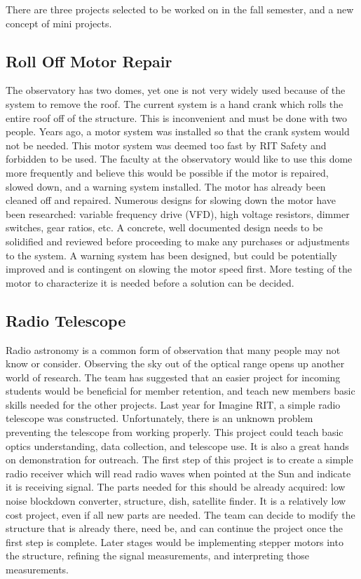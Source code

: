 \documentclass[conference]{IEEEtran} %
\begin{document}
There are three projects selected to be worked on in the fall semester, and a new concept of mini projects.  

\subsection{Roll Off Motor Repair}
\label{subsec:rolloff}
The observatory has two domes, yet one is not very widely used because of the system to remove the roof. The current system is a hand crank which rolls the entire roof off of the structure. This is inconvenient and must be done with two people. Years ago, a motor system was installed so that the crank system would not be needed. This motor system was deemed too fast by RIT Safety and forbidden to be used. The faculty at the observatory would like to use this dome more frequently and believe this would be possible if the motor is repaired, slowed down, and a warning system installed. The motor has already been cleaned off and repaired. Numerous designs for slowing down the motor have been researched: variable frequency drive (VFD), high voltage resistors, dimmer switches, gear ratios, etc. A concrete, well documented design needs to be solidified and reviewed before proceeding to make any purchases or adjustments to the system. A warning system has been designed, but could be potentially improved and is contingent on slowing the motor speed first. More testing of the motor to characterize it is needed before a solution can be decided.

\subsection{Radio Telescope}
\label{subsec:radio}
  Radio astronomy is a common form of observation that many people may not know or consider. Observing the sky out of the optical range opens up another world of research. The team has suggested that an easier project for incoming students would be beneficial for member retention, and teach new members basic skills needed for the other projects. Last year for Imagine RIT, a simple radio telescope was constructed. Unfortunately, there is an unknown problem preventing the telescope from working properly. This project could teach basic optics understanding, data collection, and telescope use. It is also a great hands on demonstration for outreach. The first step of this project is to create a simple radio receiver which will read radio waves when pointed at the Sun and indicate it is receiving signal. The parts needed for this should be already acquired: low noise blockdown converter, structure, dish, satellite finder. It is a relatively low cost project, even if all new parts are needed. The team can decide to modify the structure that is already there, need be, and can continue the project once the first step is complete. Later stages would be implementing stepper motors into the structure, refining the signal measurements, and interpreting those measurements.
  
\end{document}

